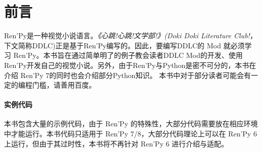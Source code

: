 \chapter{前言}

Ren'Py是一种视觉小说语言。{\itshape 《心跳!心跳!文学部!》(Doki Doki Literature Club!}，下文简称DDLC)正是基于Ren'Py编写的。因此，要编写DDLC的 Mod 就必须学习 Ren'Py。本书旨在通过简单明了的例子教会读者DDLC Mod的开发、使用 Ren'Py开发自己的视觉小说。另外，由于Ren'Py与Python是密不可分的，本书在介绍 Ren'Py 7的同时也会介绍部分Python知识。
本书中对于部分读者可能会有一定的编程门槛，请善用百度。

\subsubsection*{实例代码}
本书包含大量的示例代码，由于 Ren'Py 的特殊性，大部分代码需要放在相应环境中才能运行。本书代码只适用于 Ren'Py 7/8，大部分代码理论上可以在 Ren'Py 6 上运行，但由于其过时性，本书将不再针对 Ren'Py 6 进行介绍与适配。

